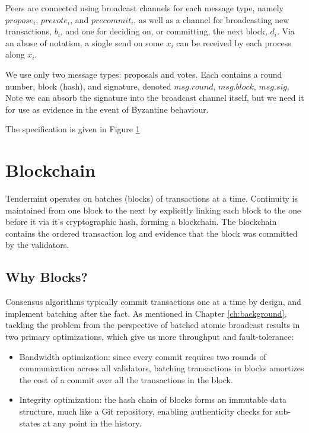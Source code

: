 Peers are connected using broadcast channels for each message type,
namely $propose_i$, $prevote_i$, and $precommit_i$,
as well as a channel for broadcasting new transactions, $b_i$,
and one for deciding on, or committing, the next block, $d_i$.
Via an abuse of notation, a single send on some $x_i$ can be received by each process along
$x_i$.

We use only two message types: proposals and votes. 
Each contains a round number, block (hash), and signature, 
denoted $msg.round$, $msg.block$, $msg.sig$.
Note we can absorb the signature into the broadcast channel itself,
but we need it for use as evidence in the event of Byzantine behaviour.

The specification is given in Figure \ref{fig:tendermint-pi}

\begin{figure}[]
	
	\label{fig:tendermint-pi}
\end{figure}

\section{Blockchain}

Tendermint operates on batches (blocks) of transactions at a time.
Continuity is maintained from one block to the next by explicitly linking each block to the one before it 
via it's cryptographic hash, forming a blockchain. 
The blockchain contains the ordered transaction log and evidence that the block was committed 
by the validators.

\subsection{Why Blocks?}
Consensus algorithms typically commit transactions one at a time by design, 
and implement batching after the fact.
As mentioned in Chapter \ref{ch:background}, 
tackling the problem from the perspective of batched atomic broadcast
results in two primary optimizations, which give us more throughput and fault-tolerance:

\begin{itemize}
\item{Bandwidth optimization: since every commit requires two rounds of communication across all validators, 
	batching transactions in blocks amortizes the cost of a commit over all the transactions in the block.}
\item{Integrity optimization: the hash chain of blocks forms an immutable data structure, much like a Git repository, enabling authenticity checks for sub-states at any point in the history.}
\end{itemize}

